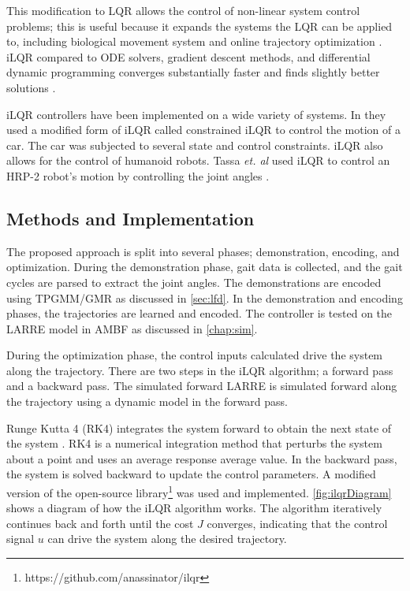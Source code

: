 This modification to LQR allows the control of non-linear system control problems; this is useful because it expands the systems the LQR can be applied to, including biological movement system \cite{iLQR_Li2004} and online trajectory optimization \cite{iLQR_tassa2012}. iLQR compared to ODE solvers, gradient descent methods, and differential dynamic programming converges substantially faster and finds slightly better solutions \cite{iLQR_Li2004}. 

iLQR controllers have been implemented on a wide variety of systems. In \cite{car} they used a modified form of iLQR called constrained iLQR to control the motion of a car. The car was subjected to several state and control constraints. iLQR also allows for the control of humanoid robots. Tassa \textit{et. al} used iLQR to control an HRP-2 robot's motion by controlling the joint angles \cite{iLQR_tassa2014}.

\subsection{Methods and Implementation}

The proposed approach is split into several phases; demonstration, encoding, and optimization. During the demonstration phase, gait data is collected, and the gait cycles are parsed to extract the joint angles. The demonstrations are encoded using TPGMM/GMR as discussed in \autoref{sec:lfd}. In the demonstration and encoding phases, the trajectories are learned and encoded. The controller is tested on the LARRE model in AMBF as discussed in \autoref{chap:sim}. 

During the optimization phase, the control inputs calculated drive the system along the trajectory. There are two steps in the iLQR algorithm; a forward pass and a backward pass. The simulated forward LARRE is simulated forward along the trajectory using a dynamic model in the forward pass. 

Runge Kutta 4 (RK4) integrates the system forward to obtain the next state of the system \cite{dit2017runge}. RK4 is a numerical integration method that perturbs the system about a point and uses an average response average value.  In the backward pass, the system is solved backward to update the control parameters. A modified version of the open-source library\footnote{https://github.com/anassinator/ilqr} was used and implemented.  \autoref{fig:ilqrDiagram} shows a diagram of how the iLQR algorithm works. The algorithm iteratively continues back and forth until the cost $J$ converges, indicating that the control signal $u$ can drive the system along the desired trajectory. 

